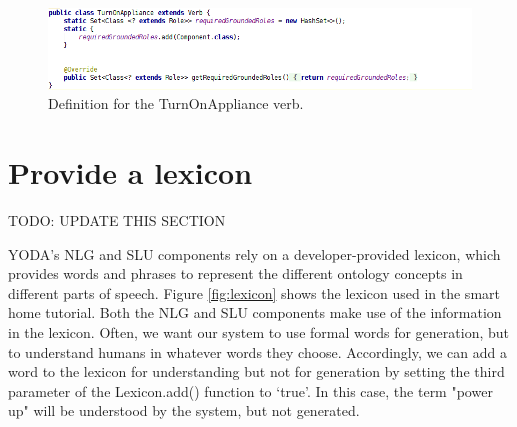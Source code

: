 \documentclass[titlepage]{article}
\begin{document}
\begin{figure}[h!]
\centering
\includegraphics[width=\textwidth]{TurnOnAppliance}
\caption{Definition for the TurnOnAppliance verb.}
\label{fig:turn_on_appliance}
\end{figure}

\section{Provide a lexicon}

TODO: UPDATE THIS SECTION


YODA's NLG and SLU components rely on a developer-provided lexicon, which provides words and phrases to represent the different ontology concepts in different parts of speech.
Figure \ref{fig:lexicon} shows the lexicon used in the smart home tutorial.
Both the NLG and SLU components make use of the information in the lexicon.
Often, we want our system to use formal words for generation, but to understand humans in whatever words they choose.
Accordingly, we can add a word to the lexicon for understanding but not for generation by setting the third parameter of the Lexicon.add() function to `true'.
In this case, the term "power up" will be understood by the system, but not generated.
\end{document}
